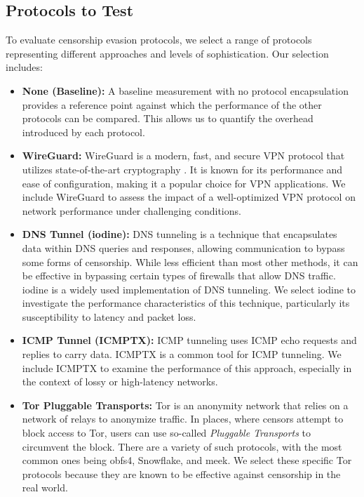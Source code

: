 \subsection{Protocols to Test}

To evaluate censorship evasion protocols, we select a range of protocols representing different approaches and levels of sophistication.
Our selection includes:

\begin{itemize}
  \item \noindent\textbf{None (Baseline):}
    A baseline measurement with no protocol encapsulation provides a reference point against which the performance of the other protocols can be compared.
    This allows us to quantify the overhead introduced by each protocol.

  \item \noindent\textbf{WireGuard:}
    WireGuard is a modern, fast, and secure VPN protocol that utilizes state-of-the-art cryptography \cite{donenfeld2017wireguard}.
    It is known for its performance and ease of configuration, making it a popular choice for VPN applications.
    We include WireGuard to assess the impact of a well-optimized VPN protocol on network performance under challenging conditions.

  \item \noindent\textbf{DNS Tunnel (iodine):}
    DNS tunneling is a technique that encapsulates data within DNS queries and responses, allowing communication to bypass some forms of censorship.
    While less efficient than most other methods, it can be effective in bypassing certain types of firewalls that allow DNS traffic.
    iodine is a widely used implementation of DNS tunneling.
    We select iodine to investigate the performance characteristics of this technique, particularly its susceptibility to latency and packet loss.

  \item \noindent\textbf{ICMP Tunnel (ICMPTX):}
    ICMP tunneling uses ICMP echo requests and replies to carry data.
    ICMPTX is a common tool for ICMP tunneling.
    We include ICMPTX to examine the performance of this approach, especially in the context of lossy or high-latency networks.

  \item \noindent\textbf{Tor Pluggable Transports:}
    Tor is an anonymity network that relies on a network of relays to anonymize traffic.
    In places, where censors attempt to block access to Tor, users can use so-called \textit{Pluggable Transports} to circumvent the block.
    There are a variety of such protocols, with the most common ones being obfs4, Snowflake, and meek.
    We select these specific Tor protocols because they are known to be effective against censorship in the real world.
\end{itemize}




